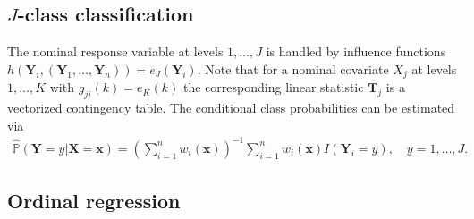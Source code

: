 \documentclass{Z}
\renewcommand{\Prob}{\mathbb{P} }
\newcommand{\X}{\mathbf{X}}
\newcommand{\Y}{\mathbf{Y}}
\newcommand{\T}{\mathbf{T}}
\newcommand{\x}{\mathbf{x}}
\begin{document}
\subsection{$J$-class classification}

The nominal response variable at levels $1, \dots, J$ 
is handled by influence
functions $h(\Y_i, (\Y_1, \dots, \Y_n)) = e_J(\Y_i)$. Note that for a
nominal covariate $X_j$ at levels $1, \dots, K$ with  
$g_{ji}(k) = e_K(k)$ the
corresponding linear statistic $\T_j$ is a vectorized contingency table.
The conditional class probabilities can be estimated via 
\begin{eqnarray*}
\hat{\Prob}(\Y = y | \X = \x) = \left(\sum_{i=1}^n w_i(\x)\right)^{-1}
\sum_{i=1}^n
w_i(\x) I(\Y_i = y), \quad y = 1, \dots, J.
\end{eqnarray*}

\subsection{Ordinal regression}
\end{document}
